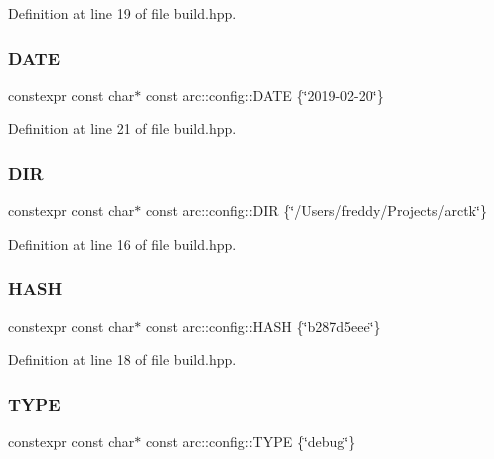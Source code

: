 Definition at line 19 of file build.\+hpp.

\mbox{\label{namespacearc_1_1config_a8f0a1dcf46a9a3101d9cced88635582b}} 
\subsubsection{\texorpdfstring{DATE}{DATE}}
{\footnotesize\ttfamily constexpr const char$\ast$ const arc\+::config\+::\+D\+A\+TE \{\char`\"{}2019-\/02-\/20\char`\"{}\}}



Definition at line 21 of file build.\+hpp.

\mbox{\label{namespacearc_1_1config_a16772240b2bebb3714996f868cb42256}} 
\subsubsection{\texorpdfstring{DIR}{DIR}}
{\footnotesize\ttfamily constexpr const char$\ast$ const arc\+::config\+::\+D\+IR \{\char`\"{}/Users/freddy/Projects/arctk\char`\"{}\}}



Definition at line 16 of file build.\+hpp.

\mbox{\label{namespacearc_1_1config_ac3fe39d64aae861ea79d304341332f28}} 
\subsubsection{\texorpdfstring{HASH}{HASH}}
{\footnotesize\ttfamily constexpr const char$\ast$ const arc\+::config\+::\+H\+A\+SH \{\char`\"{}b287d5eee\char`\"{}\}}



Definition at line 18 of file build.\+hpp.

\mbox{\label{namespacearc_1_1config_ad3c57f6f957765d78d8eef78dfe3251a}} 
\subsubsection{\texorpdfstring{TYPE}{TYPE}}
{\footnotesize\ttfamily constexpr const char$\ast$ const arc\+::config\+::\+T\+Y\+PE \{\char`\"{}debug\char`\"{}\}}



